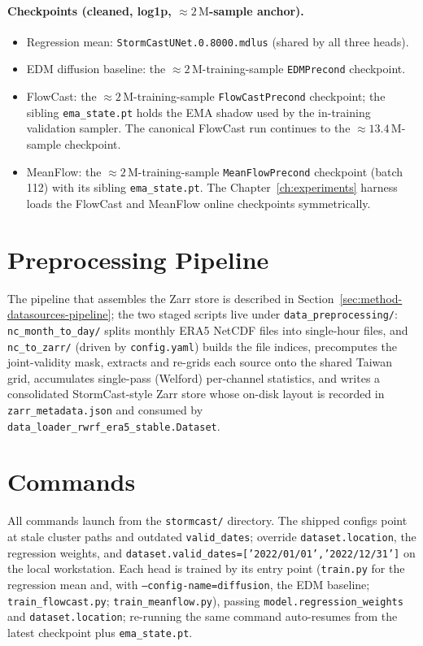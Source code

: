 \paragraph{Checkpoints (cleaned, log1p, $\approx 2\,\text{M}$-sample anchor).}
\begin{itemize}
  \item Regression mean: \texttt{StormCastUNet.0.8000.mdlus} (shared by all three heads).
  \item EDM diffusion baseline: the $\approx 2\,\text{M}$-training-sample \texttt{EDMPrecond} checkpoint.
  \item FlowCast: the $\approx 2\,\text{M}$-training-sample \texttt{FlowCastPrecond} checkpoint; the sibling \texttt{ema\_state.pt} holds the EMA shadow used by the in-training validation sampler. The canonical FlowCast run continues to the $\approx 13.4\,\text{M}$-sample checkpoint.
  \item MeanFlow: the $\approx 2\,\text{M}$-training-sample \texttt{MeanFlowPrecond} checkpoint (batch 112) with its sibling \texttt{ema\_state.pt}. The Chapter~\ref{ch:experiments} harness loads the FlowCast and MeanFlow online checkpoints symmetrically.
\end{itemize}

\section{Preprocessing Pipeline}
\label{app:preprocessing}

The pipeline that assembles the Zarr store is described in Section~\ref{sec:method-datasources-pipeline}; the two staged scripts live under \texttt{data\_preprocessing/}: \texttt{nc\_month\_to\_day/} splits monthly ERA5 NetCDF files into single-hour files, and \texttt{nc\_to\_zarr/} (driven by \texttt{config.yaml}) builds the file indices, precomputes the joint-validity mask, extracts and re-grids each source onto the shared Taiwan grid, accumulates single-pass (Welford) per-channel statistics, and writes a consolidated StormCast-style Zarr store whose on-disk layout is recorded in \texttt{zarr\_metadata.json} and consumed by \texttt{data\_loader\_rwrf\_era5\_stable.Dataset}.

\section{Commands}

All commands launch from the \texttt{stormcast/} directory. The shipped configs point at stale cluster paths and outdated \texttt{valid\_dates}; override \texttt{dataset.location}, the regression weights, and \texttt{dataset.valid\_dates=['2022/01/01','2022/12/31']} on the local workstation. Each head is trained by its entry point (\texttt{train.py} for the regression mean and, with \texttt{--config-name=diffusion}, the EDM baseline; \texttt{train\_flowcast.py}; \texttt{train\_meanflow.py}), passing \texttt{model.regression\_weights} and \texttt{dataset.location}; re-running the same command auto-resumes from the latest checkpoint plus \texttt{ema\_state.pt}.

